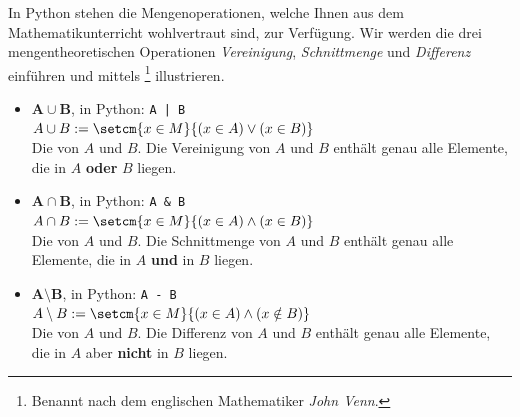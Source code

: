 In Python stehen die Mengenoperationen, welche Ihnen aus dem Mathematikunterricht wohlvertraut sind, zur Verfügung. Wir werden die drei mengentheoretischen Operationen \textit{Vereinigung}, \textit{Schnittmenge} und \textit{Differenz} einführen und mittels \footnote{Benannt nach dem englischen Mathematiker \textit{John Venn}.} illustrieren.

\begin{itemize}
	\item $\mathbf{A \cup B}$, in Python: \lstinline/A | B/\\
	      $A \cup B := \setcm{x\in M}{(x\in A) \lor (x\in B)}$\\
	      Die  von $A$ und $B$. Die Vereinigung von $A$ und $B$ enthält genau alle Elemente, die in $A$ \textbf{oder} $B$ liegen.
	      \begin{center}
	      \end{center}
	\item $\mathbf{A \cap B}$, in Python: \lstinline|A & B|\\
	      $A \cap B := \setcm{x\in M}{(x\in A) \land (x\in B)}$\\
	      Die  von $A$ und $B$. Die Schnittmenge von $A$ und $B$ enthält genau alle Elemente, die in $A$ \textbf{und} in $B$ liegen.
	      \begin{center}
	      \end{center}
	\item $\mathbf{A\setminus B}$, in Python: \lstinline|A - B|\\
	      $A\setminus B := \setcm{x\in M}{(x\in A) \land (x\notin B)}$\\
	      Die  von $A$ und $B$. Die Differenz von $A$ und $B$ enthält genau alle Elemente, die in $A$ aber \textbf{nicht} in $B$ liegen.

\end{itemize}
